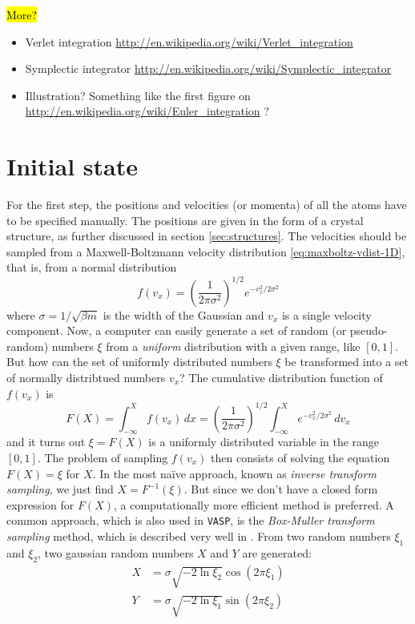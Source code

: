 \documentclass[11pt,bibliography=totoc,index=totoc]{scrbook}   %
\newcommand{\comment}[1]{\hl{#1}}
\newcommand{\vasp}{{\texttt{VASP}}} %
\begin{document}
\comment{More?}
\begin{itemize}
  \item 
Verlet integration
\url{http://en.wikipedia.org/wiki/Verlet_integration}
\item
Symplectic integrator
\url{http://en.wikipedia.org/wiki/Symplectic_integrator}
\item 
Illustration? Something like the first figure on
\url{http://en.wikipedia.org/wiki/Euler_integration} ?
\end{itemize}

\section{Initial state}

For the first step, the positions and velocities (or momenta) of all the atoms have to be specified manually. 
The positions are given in the form of a crystal structure, as further discussed in section \ref{sec:structures}.
The velocities should be sampled from a Maxwell-Boltzmann velocity distribution \eqref{eq:maxboltz-vdist-1D},
that is, from a normal distribution
\begin{equation}
    f(v_x) = \left(\frac{1}{2\pi\sigma^2}\right)^{1/2} e^{-v_x^2/2\sigma^2}
  \label{eq:normal-dist}
\end{equation}
where $\sigma=1/\sqrt{\beta m}$ is the width of the Gaussian and $v_x$ is a single velocity component.
Now, a computer can easily generate a set of random (or pseudo-random) numbers $\xi$ from a \emph{uniform} distribution with a given range, like $[0,1]$.
But how can the set of uniformly distributed numbers $\xi$ be transformed into a set of normally distribtued numbers $v_x$?
The cumulative distribution function of $f(v_x)$ is
\begin{equation}
    F(X) = \int_{-\infty}^X f(v_x)\,dx = \left(\frac{1}{2\pi\sigma^2}\right)^{1/2} \int_{-\infty}^X e^{-v_x^2/2\sigma^2} \,dv_x
    \label{eq:CDF}
\end{equation}
and it turns out $\xi = F(X)$ is a uniformly distributed variable in the range $[0,1]$. 
The problem of sampling $f(v_x)$ then consists of solving the equation $F(X)=\xi$ for $X$.
In the most naïve approach, known as \emph{inverse transform sampling}, we just find $X=F^{-1}(\xi)$.
But since we don't have a closed form expression for $F(X)$, a computationally more efficient method is preferred. 
A common approach, which is also used in \vasp, is the \emph{Box-Muller transform sampling} method, which is
described very well in \cite[101]{Tuckerman:2010}. 
From two random numbers $\xi_1$ and $\xi_2$, two gaussian random numbers $X$ and $Y$ are generated:
\begin{align}
    X &= \sigma \sqrt{-2\ln\xi_2} \cos(2\pi\xi_1) \\
    Y &= \sigma \sqrt{-2\ln\xi_1} \sin(2\pi\xi_2)
  \label{eq:box-muller-sampling}
\end{align}
\end{document}
